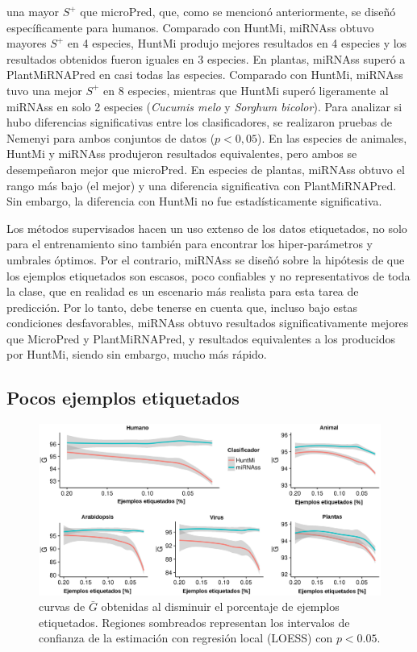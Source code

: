 una mayor $S^{+}$ que microPred, que, como se mencionó anteriormente, se diseñó específicamente para humanos. Comparado con HuntMi, miRNAss obtuvo mayores
$S^{+}$ en 4 especies, HuntMi produjo mejores resultados en 4 especies y los resultados obtenidos fueron iguales en 3 especies. En plantas, miRNAss superó a
PlantMiRNAPred en casi todas las especies. Comparado con HuntMi, miRNAss tuvo una mejor $S^{+}$ en 8 especies, mientras que HuntMi superó ligeramente al
miRNAss en solo 2 especies (\textit{Cucumis melo} y \textit{Sorghum bicolor}).
Para analizar si hubo diferencias significativas entre los clasificadores, se realizaron pruebas de Nemenyi \citep{nemenyi1962distribution} para ambos
conjuntos de datos ($ p<0,05 $). En las especies de animales, HuntMi y miRNAss produjeron resultados equivalentes, pero ambos se desempeñaron mejor que
microPred. En especies de plantas, miRNAss obtuvo el rango más bajo (el mejor) y una diferencia significativa con PlantMiRNAPred. Sin embargo, la diferencia
con HuntMi no fue estadísticamente significativa.

Los métodos supervisados hacen un uso extenso de los datos etiquetados, no solo para el entrenamiento sino también para encontrar los hiper-parámetros
y umbrales óptimos. Por el contrario, miRNAss se diseñó sobre la hipótesis de que los ejemplos etiquetados son escasos, poco confiables y no
representativos de toda la clase, que en realidad es un escenario más realista para esta tarea de predicción. Por lo tanto, debe tenerse en cuenta que,
incluso bajo estas condiciones desfavorables, miRNAss obtuvo resultados significativamente mejores que MicroPred y PlantMiRNAPred, y resultados equivalentes a
los producidos por HuntMi, siendo sin embargo, mucho más rápido.

\subsection{Pocos ejemplos etiquetados}

\begin{figure}[t]
	\centering
	\includegraphics[width=\linewidth]{fig/few_labeled-huntmi.eps}
	\caption[$\bar{G}$ con pocos ejemplos de entrenamiento]{curvas de $\bar{G}$ obtenidas al disminuir el porcentaje de ejemplos etiquetados. Regiones
		sombreados representan los intervalos de confianza de la estimación con regresión local (LOESS) con $p < 0.05$.}
	\label{fig:fewSamples:huntmi}
\end{figure}

